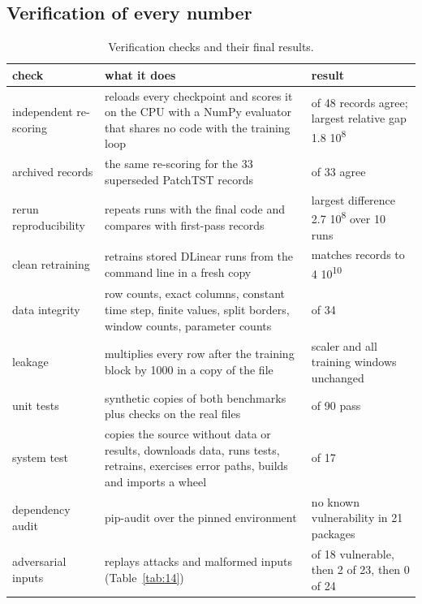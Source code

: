 \documentclass[11pt,letterpaper]{article}
\begin{document}
\subsection{Verification of every number}
\begin{table}[htbp]
\centering
\caption{Verification checks and their final results.}\label{tab:9}
{\footnotesize\setlength{\tabcolsep}{3pt}
\begin{tabular}{>{\raggedright\arraybackslash}p{}>{\raggedright\arraybackslash}p{}>{\raggedright\arraybackslash}p{}}
\toprule
\textbf{check} & \textbf{what it does} & \textbf{result} \\
\midrule
independent re-scoring & reloads every checkpoint and scores it on the CPU with a NumPy evaluator that shares no code with the training loop & 48 of 48 records agree; largest relative gap 1.8 \texttimes{} 10\textsuperscript{\textminus{}8} \\
archived records & the same re-scoring for the 33 superseded PatchTST records & 33 of 33 agree \\
rerun reproducibility & repeats runs with the final code and compares with first-pass records & largest difference 2.7 \texttimes{} 10\textsuperscript{\textminus{}8} over 10 runs \\
clean retraining & retrains stored DLinear runs from the command line in a fresh copy & matches records to 4 \texttimes{} 10\textsuperscript{\textminus{}10} \\
data integrity & row counts, exact columns, constant time step, finite values, split borders, window counts, parameter counts & 34 of 34 \\
leakage & multiplies every row after the training block by 1000 in a copy of the file & scaler and all training windows unchanged \\
unit tests & synthetic copies of both benchmarks plus checks on the real files & 90 of 90 pass \\
system test & copies the source without data or results, downloads data, runs tests, retrains, exercises error paths, builds and imports a wheel & 17 of 17 \\
dependency audit & pip-audit over the pinned environment & no known vulnerability in 21 packages \\
adversarial inputs & replays attacks and malformed inputs (Table~\ref{tab:14}) & 15 of 18 vulnerable, then 2 of 23, then 0 of 24 \\
\bottomrule
\end{tabular}}
\end{table}
\end{document}
